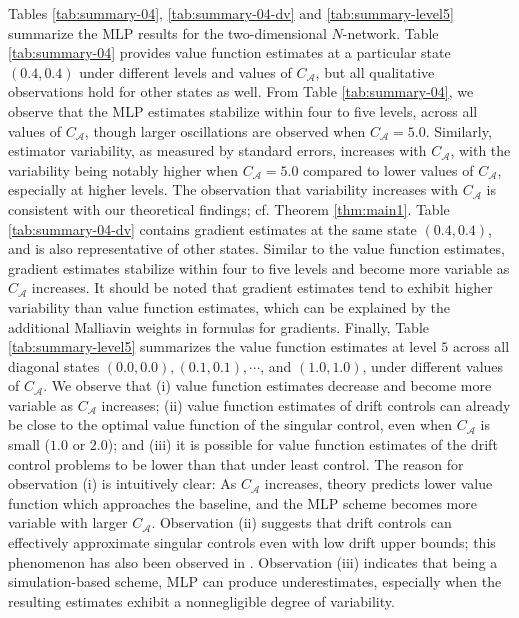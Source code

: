 \documentclass[11pt]{article}
\theoremstyle{definition}
\theoremstyle{plain}
\begin{document}
Tables \ref{tab:summary-04}, \ref{tab:summary-04-dv} and \ref{tab:summary-level5} summarize the MLP results for the two-dimensional $N$-network. 
Table \ref{tab:summary-04} provides value function estimates at a particular state $(0.4,0.4)$ 
under different levels and values of $C_{\mathcal{A}}$, but all qualitative observations 
hold for other states as well. 
From Table \ref{tab:summary-04}, we observe that the MLP estimates stabilize within four to five levels, 
across all values of $C_{\mathcal{A}}$, though larger oscillations are observed when $C_{\mathcal{A}} = 5.0$.
Similarly, estimator variability, as measured by standard errors, increases with $C_{\mathcal{A}}$, 
with the variability being notably higher when $C_{\mathcal{A}}=5.0$ compared to lower values of $C_{\mathcal{A}}$, 
especially at higher levels.  
The observation that variability increases with $C_{\mathcal{A}}$ is consistent with 
our theoretical findings; cf. Theorem \ref{thm:main1}. 
Table \ref{tab:summary-04-dv} contains gradient estimates at the same state $(0.4,0.4)$, 
and is also representative of other states. 
Similar to the value function estimates, gradient estimates stabilize within four to five levels 
and become more variable as $C_{\mathcal{A}}$ increases. 
It should be noted that gradient estimates tend to exhibit higher variability than value function estimates, 
which can be explained by the additional Malliavin weights in formulas for gradients. 
Finally, Table \ref{tab:summary-level5} summarizes the value function estimates at level $5$ 
across all diagonal states $(0.0, 0.0), (0.1, 0.1), \cdots$, and $(1.0, 1.0)$, 
under different values of $C_{\mathcal{A}}$. 
We observe that (i) value function estimates decrease and become more variable as $C_{\mathcal{A}}$ increases; 
(ii) value function estimates of drift controls can already be close to the optimal value function of the singular control, 
even when $C_{\mathcal{A}}$ is small ($1.0$ or $2.0$); 
and (iii) it is possible for value function estimates of the drift control problems to be lower than that under least control. 
The reason for observation (i) is intuitively clear: As $C_{\mathcal{A}}$ increases, theory predicts lower value function which approaches 
the baseline, and the MLP scheme becomes more variable with larger $C_{\mathcal{A}}$. 
Observation (ii) suggests that drift controls can effectively approximate singular controls even with low drift upper bounds; 
this phenomenon has also been observed in \cite{DaiZhong2010,ata2024singular}.
Observation (iii) indicates that being a simulation-based scheme, MLP can produce underestimates,
especially when the resulting estimates exhibit a nonnegligible degree of variability. 
\end{document}
